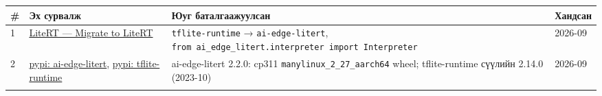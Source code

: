 \begingroup\scriptsize\begin{longtable}[]{@{}llll@{}}
\toprule
\begin{minipage}[b]{0.22\columnwidth}\raggedright
\#\strut
\end{minipage} & \begin{minipage}[b]{0.22\columnwidth}\raggedright
Эх сурвалж\strut
\end{minipage} & \begin{minipage}[b]{0.22\columnwidth}\raggedright
Юуг баталгаажуулсан\strut
\end{minipage} & \begin{minipage}[b]{0.22\columnwidth}\raggedright
Хандсан\strut
\end{minipage}\tabularnewline
\midrule
\endhead
\begin{minipage}[t]{0.22\columnwidth}\raggedright
1\strut
\end{minipage} & \begin{minipage}[t]{0.22\columnwidth}\raggedright
\href{https://ai.google.dev/edge/litert/migration}{LiteRT --- Migrate to LiteRT}\strut
\end{minipage} & \begin{minipage}[t]{0.22\columnwidth}\raggedright
\texttt{tflite-runtime} → \texttt{ai-edge-litert}, \texttt{from\ ai\_\allowbreak{}edge\_\allowbreak{}litert.\allowbreak{}interpreter\ import\ Interpreter}\strut
\end{minipage} & \begin{minipage}[t]{0.22\columnwidth}\raggedright
2026-09\strut
\end{minipage}\tabularnewline
\begin{minipage}[t]{0.22\columnwidth}\raggedright
2\strut
\end{minipage} & \begin{minipage}[t]{0.22\columnwidth}\raggedright
\href{https://pypi.org/project/ai-edge-litert/}{pypi: ai-edge-litert}, \href{https://pypi.org/project/tflite-runtime/}{pypi: tflite-runtime}\strut
\end{minipage} & \begin{minipage}[t]{0.22\columnwidth}\raggedright
ai-edge-litert 2.2.0: cp311 \texttt{manylinux\_\allowbreak{}2\_\allowbreak{}27\_\allowbreak{}aarch64} wheel; tflite-runtime сүүлийн 2.14.0 (2023-10)\strut
\end{minipage} & \begin{minipage}[t]{0.22\columnwidth}\raggedright
2026-09\strut
\end{minipage}\tabularnewline
\begin{minipage}[t]{0.22\columnwidth}\raggedright

\end{minipage}
\end{longtable}

